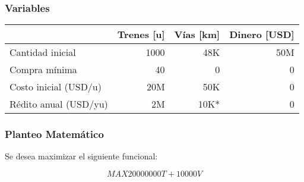 \documentclass[10pt, a4paper, titlepage,
	oneside,
	fleqn, leqno]{article}
\begin{document}
\subsubsection{Variables}

\begin{tabular}{|l|r|r|r|} \hline
    & Trenes [u] & Vías [km] & Dinero [USD]\\ \hline
  Cantidad inicial & 1000 & 48K & 50M\\ \hline
  Compra mínima & 40 & 0 & 0\\ \hline
  Costo inicial (USD/u) & 20M & 50K & 0\\ \hline
  Rédito anual (USD/yu) & 2M & 10K* & 0\\ \hline
\end{tabular}

\subsubsection{Planteo Matemático}
Se desea maximizar el siguiente funcional:

$$MAX          20000000 T + 10000 V$$


\end{document}
